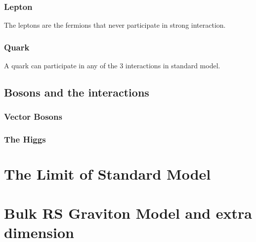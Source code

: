 \subsubsection{Lepton}
The leptons are the fermions that never participate in strong interaction. 
\subsubsection{Quark}
A quark can participate in any of the 3 interactions in standard model. 
\subsection{Bosons and the interactions}
\subsubsection{Vector Bosons}
\subsubsection{The Higgs}

\section{The Limit of Standard Model}


\section{Bulk RS Graviton Model and extra dimension}



